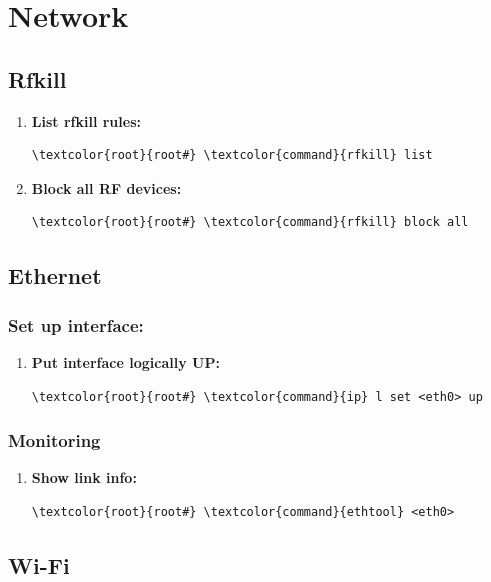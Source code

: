 \documentclass[10pt, a4paper, onecolumn, oneside, titlepage, openany]{book}
\begin{document}
\chapter{Network}
\section{Rfkill}
\begin{enumerate}
    \item \textbf{List rfkill rules:}
\begin{Verbatim}[commandchars=\\\{\}]
\textcolor{root}{root#} \textcolor{command}{rfkill} list
\end{Verbatim}
    \item \textbf{Block all RF devices:}
\begin{Verbatim}[commandchars=\\\{\}]
\textcolor{root}{root#} \textcolor{command}{rfkill} block all
\end{Verbatim}
\end{enumerate}

\section{Ethernet}
\subsection{Set up interface:}
\begin{enumerate}
    \item \textbf{Put interface logically UP:}
\begin{Verbatim}[commandchars=\\\{\}]
\textcolor{root}{root#} \textcolor{command}{ip} l set <eth0> up
\end{Verbatim}
\end{enumerate}
\subsection{Monitoring}
\begin{enumerate}
    \item \textbf{Show link info:}
\begin{Verbatim}[commandchars=\\\{\}]
\textcolor{root}{root#} \textcolor{command}{ethtool} <eth0>
\end{Verbatim}
\end{enumerate}
\section{Wi-Fi}
\end{document}
